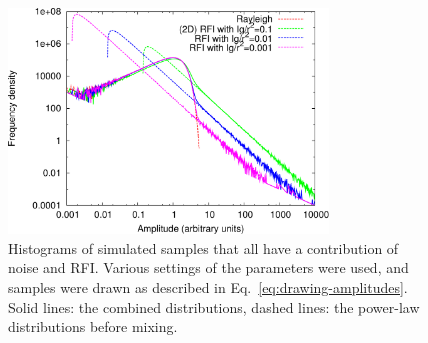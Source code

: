 \documentclass[useAMS,usenatbib]{mn2e}
\begin{document}
\begin{figure}
\begin{center}\hspace{-2mm}\includegraphics[width=8.5cm]{img/plot-rayleigh-and-rfi-combined-trimmed}
\caption{Histograms of simulated samples that all have a contribution of noise and RFI. Various settings of the parameters were used, and samples were drawn as described in Eq.~\eqref{eq:drawing-amplitudes}. Solid lines: the combined distributions, dashed lines: the power-law distributions before mixing. }
\label{fig:rayleigh-and-rfi-combined}
\end{center}
\end{figure}
\end{document}
